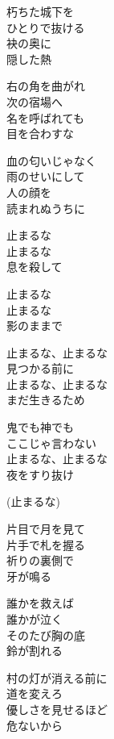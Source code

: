 \begin{lyrics}
\begin{japanese}
朽ちた城下を\\
ひとりで抜ける\\
袂の奥に\\
隠した熱

右の角を曲がれ\\
次の宿場へ\\
名を呼ばれても\\
目を合わすな

血の匂いじゃなく\\
雨のせいにして\\
人の顔を\\
読まれぬうちに
\end{japanese}

\begin{japanese}
止まるな\\
止まるな\\
息を殺して

止まるな\\
止まるな\\
影のままで
\end{japanese}

\begin{japanese}
止まるな、止まるな\\
見つかる前に\\
止まるな、止まるな\\
まだ生きるため

鬼でも神でも\\
ここじゃ言わない\\
止まるな、止まるな\\
夜をすり抜け

(止まるな)
\end{japanese}

\begin{japanese}
片目で月を見て\\
片手で札を握る\\
祈りの裏側で\\
牙が鳴る

誰かを救えば\\
誰かが泣く\\
そのたび胸の底\\
鈴が割れる

村の灯が消える前に\\
道を変えろ\\
優しさを見せるほど\\
危ないから
\end{japanese}


\end{lyrics}
